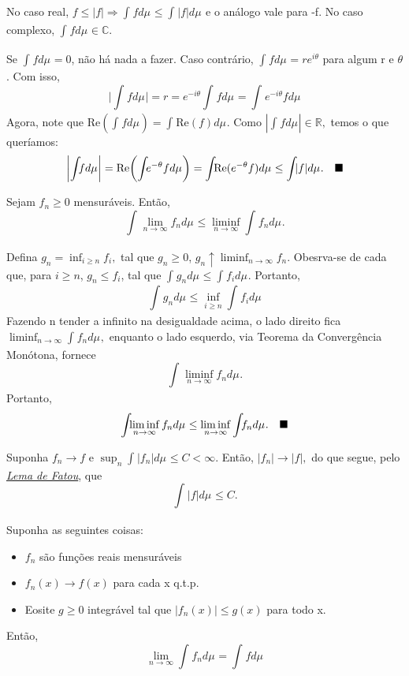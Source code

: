 \documentclass[MeasureTheory/measure_theory.tex]{subfiles}
\begin{document}
\begin{proof*}
	No caso real, \(f \leq |f| \Rightarrow \int_{}f d\mu_{} \leq \int_{}|f| d\mu_{}\) e o análogo vale para -f. No caso complexo, \(\int_{}f d\mu_{}\in \mathbb{C}.\)

	Se \(\int_{}f d\mu_{} = 0\), não há nada a fazer. Caso contrário, \(\int_{}f d\mu_{} = re^{i\theta }\) para algum r e \(\theta \). Com isso,
	\[
		\biggl\vert \int_{}f d\mu_{} \biggr\vert = r = e^{-i\theta }\int_{}f d\mu_{} = \int_{}e^{-i\theta }f d\mu_{}
	\]
	Agora, note que \(\mathrm{Re}(\int_{}f d\mu_{}) = \int_{}\mathrm{Re}(f) d\mu_{}.\) Como \(|\int_{}f d\mu_{}|\in \mathbb{R},\) temos o que queríamos:
	\[
		\biggl\vert \int_{}f d\mu_{}  \biggr\vert = \mathrm{Re}\biggl(\int_{}e^{-\theta }f d\mu_{}\biggr) = \int_{}\mathrm{Re}(e^{-\theta }f) d\mu_{} \leq \int_{}|f| d\mu_{}.\quad \text{$\blacksquare$}
	\]
\end{proof*}
\hypertarget{fatou}{
	\begin{lemma*}[Fatou]
		Sejam \(f_{n}\geq 0\) mensuráveis. Então,
		\[
			\int_{}\lim_{n\to \infty}f_{n} d\mu_{} \leq \liminf_{n\to \infty}\int_{}f_{n} d\mu_{}.
		\]
	\end{lemma*}}
\begin{proof*}
	Defina \(g_{n} = \inf_{i\geq n}f_{i},\) tal que \(g_{n}\geq 0\),  \(g_{n}\uparrow \liminf_{n\to \infty}f_{n}\). Obesrva-se de cada que, para \(i\geq n\),
	\(g_{n}\leq f_{i}\), tal que \(\int_{}g_{n} d\mu_{} \leq \int_{}f_{i} d\mu_{}.\) Portanto,
	\[
		\int_{}g_{n} d\mu_{} \leq \inf_{i\geq n} \int_{}f_{i} d\mu_{}
	\]
	Fazendo n tender a infinito na desigualdade acima, o lado direito fica \(\liminf_{n\to \infty}\int_{}f_{n} d\mu_{},\) enquanto o lado esquerdo, via Teorema da Convergência Monótona, fornece
	\[
		\int_{}\liminf_{n\to \infty}f_{n} d\mu_{}.
	\]
	Portanto,
	\[
		\int_{}\liminf_{n\to \infty}f_{n} d\mu_{} \leq \liminf_{n\to \infty}\int_{}f_{n} d\mu_{}.\quad \text{$\blacksquare$}
	\]
\end{proof*}
\begin{example}
	Suponha \(f_{n}\longrightarrow f\) e \(\sup_{n}\int_{}|f_{n}| d\mu_{} \leq C < \infty.\) Então, \(|f_{n}|\to |f|,\) do que segue, pelo \hyperlink{fatou}{\textit{Lema de Fatou}}, que
	\[
		\int_{}|f| d\mu_{} \leq C.
	\]
\end{example}
\hypertarget{dominated_convergence}{
	\begin{theorem*}
		Suponha as seguintes coisas:
		\begin{itemize}
			\item \(f_{n}\) são funções reais mensuráveis
			\item \(f_{n}(x)\to f(x)\) para cada x q.t.p.
			\item Eosite \(g\geq 0\) integrável tal que \(|f_{n}(x)| \leq g(x)\) para todo x.
		\end{itemize}
		Então,
		\[
			\lim_{n\to \infty}\int_{}f_{n} d\mu_{} = \int_{}f d\mu_{}
		\]
	\end{theorem*}}
\end{document}
